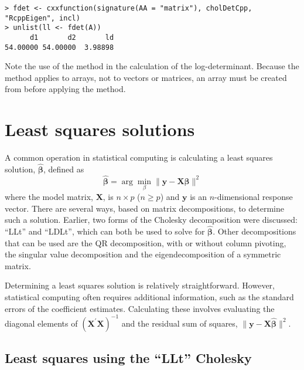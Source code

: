 \documentclass[shortnames,article,nojss]{jss}
\begin{document}
\begin{verbatim}
> fdet <- cxxfunction(signature(AA = "matrix"), cholDetCpp, "RcppEigen", incl)
> unlist(ll <- fdet(A))
      d1       d2       ld 
54.00000 54.00000  3.98898 
\end{verbatim}


Note the use of the  method in the calculation of the
log-determinant.  Because the  method applies to arrays,
not to vectors or matrices, an array must be created from 
before applying the  method.

\section{Least squares solutions}
\label{sec:leastSquares}

A common operation in statistical computing is calculating a least
squares solution, $\widehat{\bm\beta}$, defined as
\begin{displaymath}
  \widehat{\bm\beta}=\arg\min_{\beta}\|\bm y-\bm X\bm\beta\|^2
\end{displaymath}
where the model matrix, $\bm X$, is $n\times p$ ($n\ge p$) and $\bm y$
is an $n$-dimensional response vector.  There are several ways, based
on matrix decompositions, to determine such a solution.  Earlier, two forms
of the Cholesky decomposition were discussed: ``LLt'' and
``LDLt'', which can both be used to solve for $\widehat{\bm\beta}$.  Other
decompositions that can be used are the QR decomposition, with or
without column pivoting, the singular value decomposition and the
eigendecomposition of a symmetric matrix.

Determining a least squares solution is relatively straightforward.
However, statistical computing often requires additional information,
such as the standard errors of the coefficient estimates.  Calculating
these involves evaluating the diagonal elements of $\left(\bm
  X^\prime\bm X\right)^{-1}$ and the residual sum of squares, $\|\bm
y-\bm X\widehat{\bm\beta}\|^2$.

\subsection{Least squares using the ``LLt'' Cholesky}
\label{sec:LLtLeastSquares}
\end{document}
